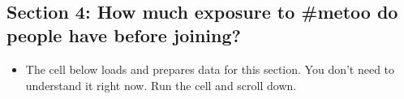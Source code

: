 \documentclass[11pt]{article}
\providecommand{\tightlist}{%
      \setlength{\itemsep}{0pt}\setlength{\parskip}{0pt}}
\begin{document}
    \begin{center}
    \end{center}
    { \hspace*{\fill} \\}
    
    \hypertarget{section-4-how-much-exposure-to-metoo-do-people-have-before-joining}{%
\subsection{Section 4: How much exposure to \#metoo do people have
before
joining?}\label{section-4-how-much-exposure-to-metoo-do-people-have-before-joining}}

\begin{itemize}
\tightlist
\item
  The cell below loads and prepares data for this section. You don't
  need to understand it right now. Run the cell and scroll down.
\end{itemize}
\end{document}
